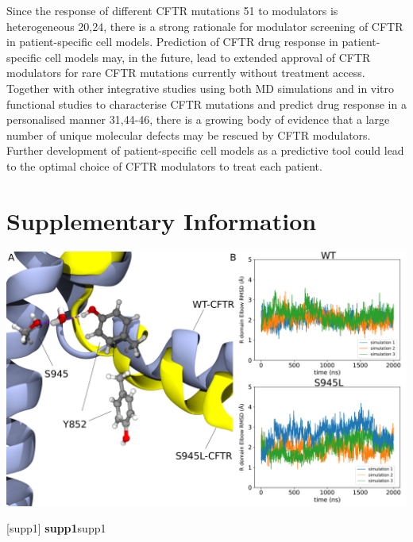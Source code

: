 Since the response of different CFTR mutations \cite{laselva2021}51 to modulators is heterogeneous \cite{wainwright2015,boyle2014} 20,24, there is a strong rationale for modulator screening of CFTR in patient-specific cell models. Prediction of CFTR drug response in patient-specific cell models may, in the future, lead to extended approval of CFTR modulators for rare CFTR mutations currently without treatment access. Together with other integrative studies using both MD simulations and in vitro functional studies to characterise CFTR mutations and predict drug response in a personalised manner \cite{wong2022,wong2022a,billet2020,sabusap2021} 31,44-46, there is a growing body of evidence that a large number of unique molecular defects may be rescued by CFTR modulators. Further development of patient-specific cell models as a predictive tool could lead to the optimal choice of CFTR modulators to treat each patient.  

\section {Supplementary Information}
\renewcommand{\thefigure}{\arabic{chapter}.S\arabic{figure}}

\begin{center}
	\includegraphics[width=\textwidth]{figures/S945L/Supp1_MD.pdf}
\end{center}
	\captionsetup{singlelinecheck = false, justification=raggedright}
\begingroup
{}[supp1] {\textbf{supp1}}{supp1}
\label{S945L_MD_1}
\endgroup


